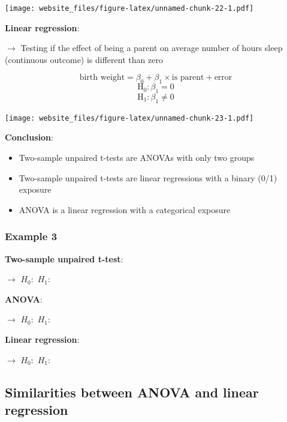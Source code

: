 \documentclass[12pt,]{article}
\providecommand{\tightlist}{%
  \setlength{\itemsep}{0pt}\setlength{\parskip}{0pt}}
\begin{document}
\texttt{[image: website\_files/figure-latex/unnamed-chunk-22-1.pdf]}

\newpage

\textbf{Linear regression}:

\(\rightarrow\) Testing if the effect of being a parent on average
number of hours sleep (continuous outcome) is different than zero

\[\text{birth weight} = \beta_0 + \beta_1 \times \text{is parent} + \text{error}\]
\[\text{H}_0: \beta_1 = 0\] \[\text{H}_1: \beta_1 \ne 0\]

\texttt{[image: website\_files/figure-latex/unnamed-chunk-23-1.pdf]}

\textbf{Conclusion}:

\begin{itemize}
\tightlist
\item
  Two-sample unpaired t-tests are ANOVAs with only two groups
\item
  Two-sample unpaired t-tests are linear regressions with a binary (0/1)
  exposure
\item
  ANOVA is a linear regression with a categorical exposure
\end{itemize}

\newpage

\subsubsection{Example 3}\label{example-3-5}

\textbf{Two-sample unpaired t-test}:

\(\rightarrow\) \hfill \break
\hfill \break
\hfill \break
\(H_0:\) \hfill \break
\hfill \break
\hfill \break
\(H_1:\) \hfill \break
\hfill \break
\hfill \break

\textbf{ANOVA}:

\(\rightarrow\) \hfill \break
\hfill \break
\hfill \break
\(H_0:\) \hfill \break
\hfill \break
\hfill \break
\(H_1:\) \hfill \break
\hfill \break
\hfill \break

\textbf{Linear regression}:

\(\rightarrow\) \hfill \break
\hfill \break
\hfill \break
\hfill \break
\hfill \break
\hfill \break
\(H_0:\) \hfill \break
\hfill \break
\hfill \break
\(H_1:\) \hfill \break
\hfill \break
\hfill \break

\newpage

\subsection{Similarities between ANOVA and linear
regression}\label{similarities-between-anova-and-linear-regression}
\end{document}
